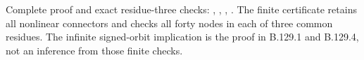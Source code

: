 \begingroup\raggedright\footnotesize
Complete proof and exact residue-three checks:
,
,
,
.
The finite certificate retains all nonlinear connectors and
checks all forty nodes in each of three common residues.
The infinite signed-orbit implication is the proof in
B.129.1 and B.129.4, not an inference from those finite checks.
\par\endgroup
